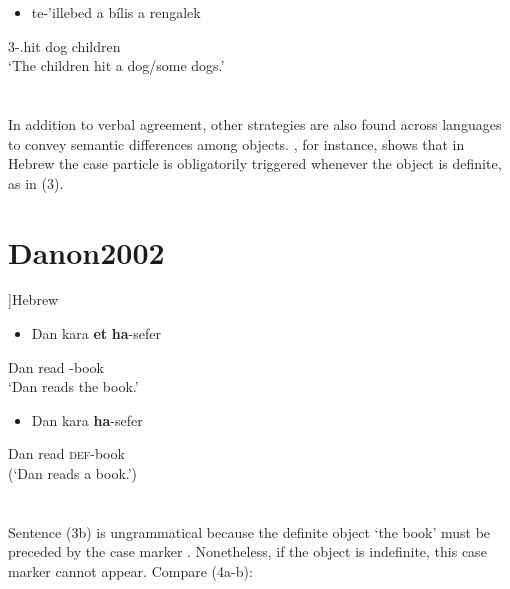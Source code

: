 \documentclass[output=paper]{langsci/langscibook}
\begin{document}
\begin{itemize}
\item \gll te-’illebed           a bílis         a rengalek\\
\end{itemize}
     \textsc{3}\textsc{{}-}.hit         dog             children\\
\glt ‘The children hit a dog/some dogs.’
\z

\chapter[]{\rmfamily }

In addition to verbal agreement, other strategies are also found across languages to convey semantic differences among objects. \citet{Danon2002}, for instance, shows that in Hebrew the case particle  is obligatorily triggered whenever the object is definite, as in (3).

\chapter[Hebrew \citep[1]{Danon2002}]{Hebrew \citep[1]{Danon2002}}
\label{bkm:Ref455883870}\setcounter{itemize}{0}
\begin{itemize}
\item \gll Dan       kara       \textbf{et}       \textbf{ha}{}-sefer\\
\end{itemize}
     Dan       read       -book\\
\glt ‘Dan reads the book.’
\z

\begin{itemize}
\item \gll *Dan       kara              \textbf{ha}{}-sefer\\
\end{itemize}
     Dan         read              \textsc{def}{}-book\\
\glt (‘Dan reads a book.’)
\z

\chapter[]{\rmfamily }

Sentence (3b) is ungrammatical because the definite object  ‘the book’ must be preceded by the case marker . Nonetheless, if the object is indefinite, this case marker cannot appear. Compare (4a-b):
\end{document}
